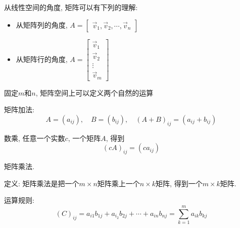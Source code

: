 从线性空间的角度, 矩阵可以有下列的理解:
\begin{itemize}
    \item 从矩阵列的角度, $A = \begin{bmatrix} \vec{v}_1, \vec{v}_2, \cdots, \vec{v}_n \end{bmatrix}$

    \item 从矩阵行的角度, $A = \begin{bmatrix} \vec{v}_1\\ \vec{v}_2\\ \vdots\\ \vec{v}_m \end{bmatrix}$
\end{itemize}

固定$m$和$n$, 矩阵空间上可以定义两个自然的运算

\begin{definition}
    矩阵加法:\begin{equation}
      A= \left( a_{ij} \right) ,\quad B = \left( b_{ij} \right) ,\quad \left( A+B \right) _{ij}=\left( a_{ij}+b_{ij} \right) 
    \end{equation}
\end{definition}

\begin{definition}
    数乘, 任意一个实数$c$, 一个矩阵$A$, 得到
    \begin{equation}
      \left( cA \right) _{ij}= \left( c a_{ij} \right) 
    \end{equation}
\end{definition}

\begin{definition}
    矩阵乘法. 
    
    定义: 矩阵乘法是把一个$m \times n$矩阵乘上一个$n \times k$矩阵, 得到一个$m \times k$矩阵.

    运算规则:
    \begin{equation}
      \left( C \right) _{ij} = a_{i1} b_{1j} + a_{i_2} b_{2j} + \cdots + a_{in} b_{nj} = \sum_{k=1}^{m} a_{ik}b_{kj}
    \end{equation}
\end{definition}

